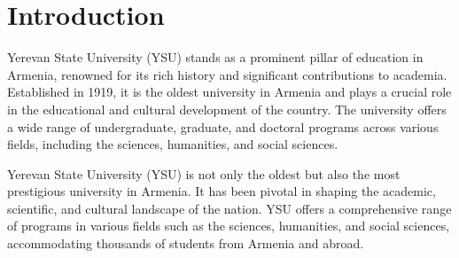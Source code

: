 \documentclass[12pt,onecolumn]{article}
\begin{document}
\newcommand{\authorFullNameArm}{Պողոս Պետրոսյան Պետրոսի}
\newcommand{\authorNameEng}{Poghos Petrosyan}
\newcommand{\authorNameArm}{Պողոս Պետրոսյան}
\newcommand{\supervisorNameArm}{ֆ.մ.գ.դ., Ջեֆրի Հինթոն}
\newcommand{\programCoordinatorName}{ֆ.մ.գ.դ., ասիստենտ Կարեն Քեռյան}

\newcommand{\thesisTitleArm}{ԵՊՀ-ի դերը Հայաստանի կրթական և տնտեսական լանդշաֆտի ձևավորման գործում}
\newcommand{\thesisTitleEng}{YSU's Role in Shaping Armenia's Educational and Economic Landscape}
\newcommand{\thesisTitleRus}{Роль ЕГУ в формировании образовательного и экономического ландшафта Армении}







\setmainfont{Times New Roman}
\fontsize{12pt}{12pt}\selectfont


\tableofcontents
\clearpage

\hypersetup{linkcolor=red}


\section{Introduction}

Yerevan State University (YSU) stands as a prominent pillar of education in Armenia, renowned for its rich history and significant contributions to academia. Established in 1919, it is the oldest university in Armenia and plays a crucial role in the educational and cultural development of the country. The university offers a wide range of undergraduate, graduate, and doctoral programs across various fields, including the sciences, humanities, and social sciences.

Yerevan State University (YSU) is not only the oldest but also the most prestigious university in Armenia. It has been pivotal in shaping the academic, scientific, and cultural landscape of the nation. YSU offers a comprehensive range of programs in various fields such as the sciences, humanities, and social sciences, accommodating thousands of students from Armenia and abroad.
\end{document}
